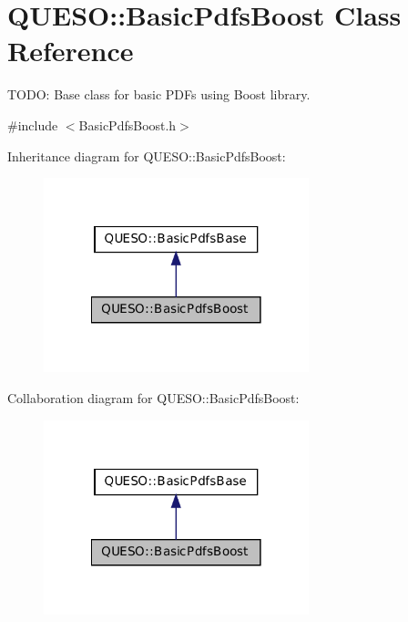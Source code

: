 \hypertarget{class_q_u_e_s_o_1_1_basic_pdfs_boost}{\section{Q\-U\-E\-S\-O\-:\-:Basic\-Pdfs\-Boost Class Reference}
\label{class_q_u_e_s_o_1_1_basic_pdfs_boost}
}


T\-O\-D\-O\-: Base class for basic P\-D\-Fs using Boost library.  




{\ttfamily \#include $<$Basic\-Pdfs\-Boost.\-h$>$}



Inheritance diagram for Q\-U\-E\-S\-O\-:\-:Basic\-Pdfs\-Boost\-:
\nopagebreak
\begin{figure}[H]
\begin{center}
\leavevmode
\includegraphics[width=218pt]{class_q_u_e_s_o_1_1_basic_pdfs_boost__inherit__graph}
\end{center}
\end{figure}


Collaboration diagram for Q\-U\-E\-S\-O\-:\-:Basic\-Pdfs\-Boost\-:
\nopagebreak
\begin{figure}[H]
\begin{center}
\leavevmode
\includegraphics[width=218pt]{class_q_u_e_s_o_1_1_basic_pdfs_boost__coll__graph}
\end{center}
\end{figure}
